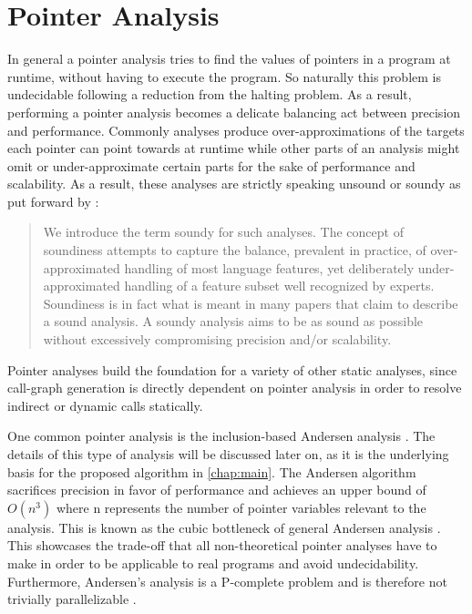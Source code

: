 \section{Pointer Analysis}\label{sec:pta}
In general a pointer analysis tries to find the values of pointers in a program at runtime, without having to execute the program.
So naturally this problem is undecidable \cite{landi1992undecidability} following a reduction from the halting problem.
As a result, performing a pointer analysis becomes a delicate balancing act between precision and performance.
Commonly analyses produce over-approximations of the targets each pointer can point towards at runtime while other parts of an analysis might omit or under-approximate certain parts for the sake of performance and scalability.
As a result, these analyses are strictly speaking unsound or soundy as put forward by \cite{livshits2015defense}:

\begin{quote}
    We introduce the term soundy for
    such analyses. The concept of soundiness
    attempts to capture the balance,
    prevalent in practice, of over-approximated
    handling of most language features, yet deliberately
    under-approximated handling of a feature subset well
    recognized by experts. Soundiness is in
    fact what is meant in many papers that
    claim to describe a sound analysis. A
    soundy analysis aims to be as sound as
    possible without excessively compromising
    precision and/or scalability.
\end{quote}

Pointer analyses build the foundation for a variety of other static analyses, since call-graph generation is directly dependent on pointer analysis in order to resolve indirect or dynamic calls statically.

One common pointer analysis is the inclusion-based Andersen analysis \cite{andersen1994program}. The details of this type of analysis will be discussed later on, as it is the underlying basis for the proposed algorithm in \autoref{chap:main}. The Andersen algorithm sacrifices precision in favor of performance and achieves an upper bound of $O(n^3)$ where n represents the number of pointer variables relevant to the analysis. This is known as the cubic bottleneck of general Andersen analysis \cite{mathiasen2021fine}.
This showcases the trade-off that all non-theoretical pointer analyses have to make in order to be applicable to real programs and avoid undecidability. Furthermore, Andersen's analysis is a P-complete problem and is therefore not trivially parallelizable \cite{mathiasen2021fine}.

